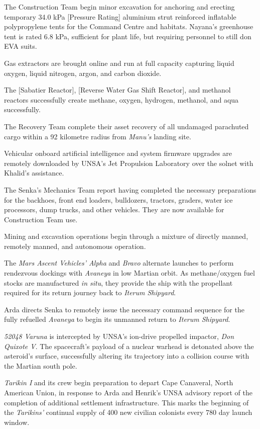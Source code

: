 The Construction Team begin minor excavation for anchoring and erecting temporary 34.0 kPa [Pressure Rating] aluminium strut reinforced inflatable polypropylene tents for the Command Centre and habitats. Nayana's greenhouse tent is rated 6.8 kPa, sufficient for plant life, but requiring personnel to still don EVA suits.
\StopTimelineDate

Gas extractors are brought online and run at full capacity capturing liquid oxygen, liquid nitrogen, argon, and carbon dioxide. 

The [Sabatier Reactor], [Reverse Water Gas Shift Reactor], and methanol reactors successfully create methane, oxygen, hydrogen, methanol, and aqua successfully.
\StopTimelineDate

The Recovery Team complete their asset recovery of all undamaged parachuted cargo within a 92 kilometre radius from {\it Manu's} landing site.
\StopTimelineDate

Vehicular onboard artificial intelligence and system firmware upgrades are remotely downloaded by UNSA's Jet Propulsion Laboratory over the solnet with Khalid's assistance.

The Senka's Mechanics Team report having completed the necessary preparations for the backhoes, front end loaders, bulldozers, tractors, graders, water ice processors, dump trucks, and other vehicles. They are now available for Construction Team use.

Mining and excavation operations begin through a mixture of directly manned, remotely manned, and autonomous operation.
\StopTimelineDate

The {\it Mars Ascent Vehicles' Alpha} and {\it Bravo} alternate launches to perform rendezvous dockings with {\it Avaneya} in low Martian orbit. As methane/oxygen fuel stocks are manufactured {\it in situ}, they provide the ship with the propellant required for its return journey back to {\it Iterum Shipyard}.
\StopTimelineDate

Arda directs Senka to remotely issue the necessary command sequence for the fully refuelled {\it Avaneya} to begin its unmanned return to {\it Iterum Shipyard}.
\StopTimelineDate

{\it 52048 Varuna} is intercepted by UNSA's ion-drive propelled impactor, {\it Don Quixote V}. The spacecraft's payload of a nuclear warhead is detonated above the asteroid's surface, successfully altering its trajectory into a collision course with the Martian south pole.
\StopTimelineDate

{\it Tarikin I} and its crew begin preparation to depart Cape Canaveral, North American Union, in response to Arda and Henrik's UNSA advisory report of the completion of additional settlement infrastructure. This marks the beginning of the {\it Tarikins'} continual supply of 400 new civilian colonists every 780 day launch window.
\StopTimelineDate

